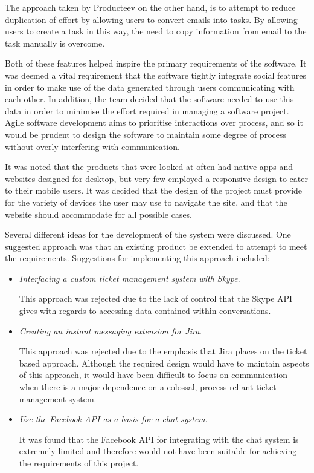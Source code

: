 \documentclass[a4paper]{l3proj}
\begin{document}
The approach taken by Producteev on the other hand, is to attempt to reduce duplication of effort by allowing users to convert emails into tasks. By allowing users to create a task in this way, the need to copy information from email to the task manually is overcome.

Both of these features helped inspire the primary requirements of the software. It was deemed a vital requirement that the software tightly integrate social features in order to make use of the data generated through users communicating with each other. In addition, the team decided that the software needed to use this data in order to minimise the effort required in managing a software project. Agile software development aims to prioritise interactions over process, and so it would be prudent to design the software to maintain some degree of process without overly interfering with communication.

It was noted that the products that were looked at often had native apps and websites designed for desktop, but very few employed a responsive design to cater to their mobile users. It was decided that the design of the project must provide for the variety of devices the user may use to navigate the site, and that the website should accommodate for all possible cases.

Several different ideas for the development of the system were discussed. One suggested approach was that an existing product be extended to attempt to meet the requirements. Suggestions for implementing this approach included:

\begin{itemize}
\item \textit{Interfacing a custom ticket management system with Skype}. \par This approach was rejected due to the lack of control that the Skype API gives with regards to accessing data contained within conversations.
\item \textit{Creating an instant messaging extension for Jira}. \par This approach was rejected due to the emphasis that Jira places on the ticket based approach. Although the required design would have to maintain aspects of this approach, it would have been difficult to focus on communication when there is a major dependence on a colossal, process reliant ticket management system.
\item \textit{Use the Facebook API as a basis for a chat system}. \par  It was found that the Facebook API for integrating with the chat system is extremely limited and therefore would not have been suitable for achieving the requirements of this project.

\end{itemize}
\end{document}
